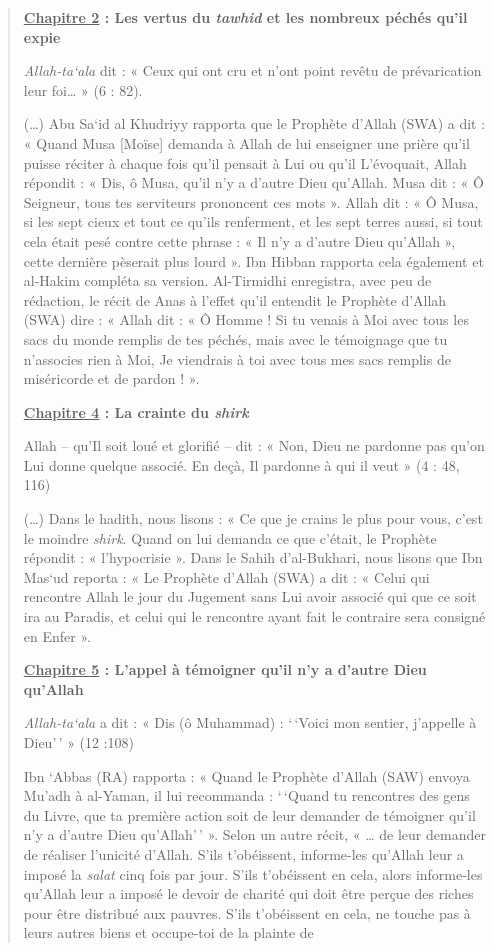 \begin{quote}
\textbf{\underline{Chapitre 2} : Les vertus du \emph{tawhid} et les
nombreux péchés qu'il expie}

\emph{Allah-ta`ala} dit : « Ceux qui ont cru et n'ont point revêtu de
prévarication leur foi\ldots{} » (6 : 82).

(\ldots) Abu Sa`id al Khudriyy rapporta que le Prophète d'Allah (SWA) a
dit : « Quand Musa {[}Moïse{]} demanda à Allah de lui enseigner une
prière qu'il puisse réciter à chaque fois qu'il pensait à Lui ou qu'il
L'évoquait, Allah répondit : « Dis, ô Musa, qu'il n'y a d'autre Dieu
qu'Allah. Musa dit : « Ô Seigneur, tous tes serviteurs prononcent ces
mots ». Allah dit : « Ô Musa, si les sept cieux et tout ce qu'ils
renferment, et les sept terres aussi, si tout cela était pesé contre
cette phrase : « Il n'y a d'autre Dieu qu'Allah », cette dernière
pèserait plus lourd ». Ibn Hibban rapporta cela également et al-Hakim
compléta sa version. Al-Tirmidhi enregistra, avec peu de rédaction, le
récit de Anas à l'effet qu'il entendit le Prophète d'Allah (SWA) dire :
« Allah dit : « Ô Homme ! Si tu venais à Moi avec tous les sacs du monde
remplis de tes péchés, mais avec le témoignage que tu n'associes rien à
Moi, Je viendrais à toi avec tous mes sacs remplis de miséricorde et de
pardon ! ».

\textbf{\underline{Chapitre 4} : La crainte du \emph{shirk}}

Allah -- qu'Il soit loué et glorifié -- dit : « Non, Dieu ne pardonne
pas qu'on Lui donne quelque associé. En deçà, Il pardonne à qui il veut
» (4 : 48, 116)

(\ldots) Dans le hadith, nous lisons : « Ce que je crains le plus pour
vous, c'est le moindre \emph{shirk}. Quand on lui demanda ce que
c'était, le Prophète répondit : « l'hypocrisie ». Dans le Sahih
d'al-Bukhari, nous lisons que Ibn Mas`ud reporta : « Le Prophète d'Allah
(SWA) a dit : « Celui qui rencontre Allah le jour du Jugement sans Lui
avoir associé qui que ce soit ira au Paradis, et celui qui le rencontre
ayant fait le contraire sera consigné en Enfer ».

\textbf{\underline{Chapitre 5} : L'appel à témoigner qu'il n'y a d'autre
Dieu qu'Allah}

\emph{Allah-ta`ala} a dit : « Dis (ô Muhammad) : `\,`Voici mon sentier,
j'appelle à Dieu'\,' » (12 :108)

Ibn `Abbas (RA) rapporta : « Quand le Prophète d'Allah (SAW) envoya
Mu'adh à al-Yaman, il lui recommanda : `\,`Quand tu rencontres des gens
du Livre, que ta première action soit de leur demander de témoigner
qu'il n'y a d'autre Dieu qu'Allah'\,' ». Selon un autre récit, «
\ldots{} de leur demander de réaliser l'unicité d'Allah. S'ils
t'obéissent, informe-les qu'Allah leur a imposé la \emph{salat} cinq
fois par jour. S'ils t'obéissent en cela, alors informe-les qu'Allah
leur a imposé le devoir de charité qui doit être perçue des riches pour
être distribué aux pauvres. S'ils t'obéissent en cela, ne touche pas à
leurs autres biens et occupe-toi de la plainte de


\end{quote}
